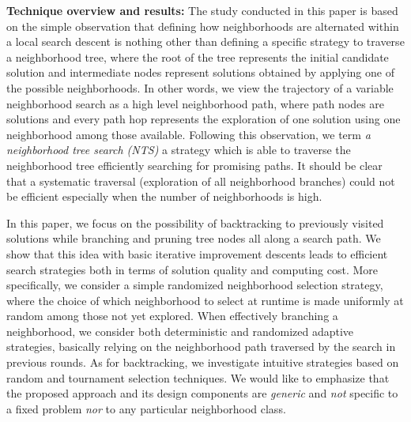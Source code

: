 \documentclass{acm_proc_article-sp}
\begin{document}
\textbf{Technique overview and results:}
The study conducted in this paper is based on the simple observation that defining how neighborhoods are alternated within a local search descent is nothing other than defining a specific strategy to traverse a neighborhood tree, where the root of the tree represents the initial candidate solution and intermediate nodes represent solutions obtained by applying one of the possible neighborhoods. In other words, we view the trajectory of a variable neighborhood search as a high level neighborhood path, where path nodes are solutions and every path hop represents the exploration of one solution using one neighborhood among those available. Following this observation, we term \emph{a neighborhood tree search (NTS)} a strategy which is able to traverse the neighborhood tree efficiently searching for promising paths. It should be clear that a systematic traversal (exploration of all neighborhood branches) could not be efficient especially when the number of neighborhoods is high.

In this paper, we focus on the possibility of backtracking to previously visited solutions while branching and pruning tree nodes all along a search path. We show that this idea with basic iterative improvement descents leads to efficient search strategies both in terms of solution quality and computing cost. More specifically, we consider a simple randomized neighborhood selection strategy, where the choice of which neighborhood to select at runtime is made uniformly at random among those not yet explored. When effectively branching a neighborhood, we consider both deterministic and randomized adaptive strategies, basically relying on the neighborhood path traversed by the search in previous rounds. As for backtracking, we investigate intuitive strategies based on random and tournament selection techniques. We would like to emphasize that the proposed approach and its design components are \emph{generic} and \emph{not} specific to a fixed problem \emph{nor} to any particular neighborhood class.
\end{document}
